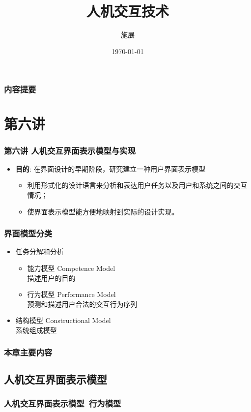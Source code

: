 \documentclass{beamer}
\title{人机交互技术}
\author{施展}
\institute{华中科技大学~武汉光电国家实验室}
\date{\today}
\begin{document}
\begin{frame}
	\titlepage
\end{frame}

\begin{frame}
	\frametitle{内容提要}
	\tableofcontents
\end{frame}

\section{第六讲}
\begin{frame}
	\frametitle{第六讲 人机交互界面表示模型与实现}
	\begin{itemize}
		\item \textbf{目的}: 在界面设计的早期阶段，研究建立一种用户界面表示模型
		\begin{itemize}
			\item 利用形式化的设计语言来分析和表达用户任务以及用户和系统之间的交互情况；
			\item 使界面表示模型能方便地映射到实际的设计实现。
		\end{itemize}
	\end{itemize}
\end{frame}

\begin{frame}
	\frametitle{界面模型分类}
	\begin{itemize}
		\item 任务分解和分析
		\begin{itemize}
			\item 能力模型 Competence Model\\描述用户的目的
			\item 行为模型 Performance Model\\预测和描述用户合法的交互行为序列
		\end{itemize}
		\item 结构模型 Constructional Model\\系统组成模型
	\end{itemize}
\end{frame}

\begin{frame}
	\frametitle{本章主要内容}

\end{frame}

\subsection{人机交互界面表示模型}
\begin{frame}
	\frametitle{{\small 人机交互界面表示模型}~\textbf{行为模型}}

\end{frame}
\end{document}
